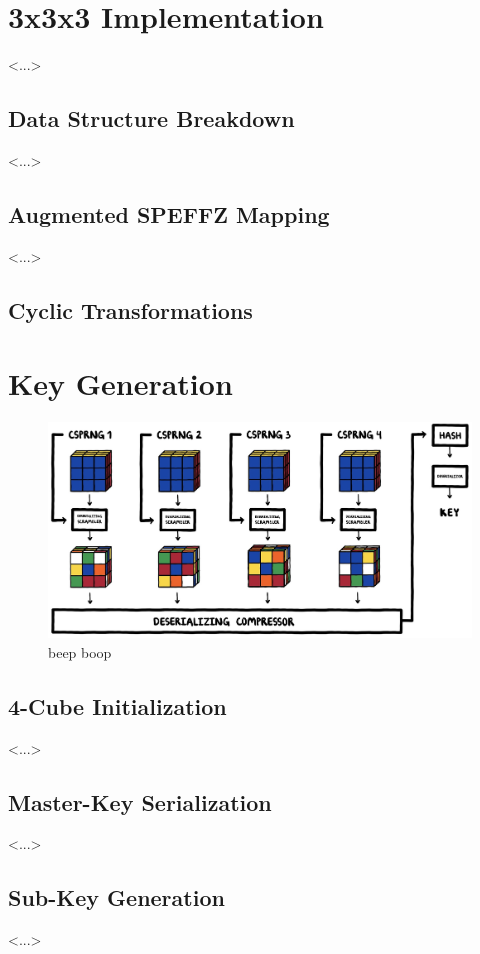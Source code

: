 \documentclass[12pt]{article}
\begin{document}
\section{3x3x3 Implementation}
<...>

\subsection{Data Structure Breakdown}
<...>

\subsection{Augmented SPEFFZ Mapping}
<...>

\subsection{Cyclic Transformations}

\section{Key Generation}

\begin{figure}[H]
    \centering
    \includegraphics[width=\textwidth]{key_gen/keygen.jpg}
    \caption{beep boop}
\end{figure}

\subsection{4-Cube Initialization}
<...>

\subsection{Master-Key Serialization}
<...>

\subsection{Sub-Key Generation}
<...>
\end{document}
